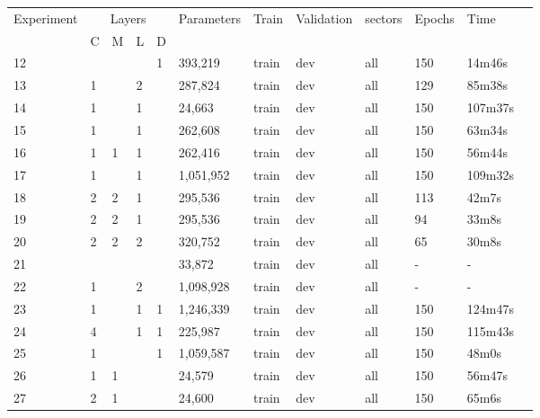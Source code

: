 \begin{table}[]
\begin{tabular}{|l|l|l|l|l|l|l|l|l|l|l|l|}
\hline
Experiment & \multicolumn{4}{c|}{Layers}                                                                       & Parameters            & Train                 & Validation            & sectors               & Epochs & Time    \\ \cline{2-5}
   & C & M & L  & D &           &       &     &     &     &         \\ \hline
12 &   &   &    & 1 & 393,219   & train & dev & all & 150 & 14m46s  \\ \hline
13 & 1 &   &  2 &   & 287,824   & train & dev & all & 129 & 85m38s  \\ \hline
14 & 1 &   &  1 &   & 24,663    & train & dev & all & 150 & 107m37s \\ \hline
15 & 1 &   &  1 &   & 262,608   & train & dev & all & 150 & 63m34s  \\ \hline
16 & 1 & 1 &  1 &   & 262,416   & train & dev & all & 150 & 56m44s  \\ \hline
17 & 1 &   &  1 &   & 1,051,952 & train & dev & all & 150 & 109m32s \\ \hline
18 & 2 & 2 &  1 &   & 295,536   & train & dev & all & 113 & 42m7s   \\ \hline
19 & 2 & 2 &  1 &   & 295,536   & train & dev & all & 94  & 33m8s   \\ \hline
20 & 2 & 2 &  2 &   & 320,752   & train & dev & all & 65  & 30m8s   \\ \hline
21 &   &   &    &   & 33,872    & train & dev & all & -   & -       \\ \hline
22 & 1 &   &  2 &   & 1,098,928 & train & dev & all & -   & -       \\ \hline
23 & 1 &   &  1 & 1 & 1,246,339 & train & dev & all & 150 & 124m47s \\ \hline
24 & 4 &   &  1 & 1 & 225,987   & train & dev & all & 150 & 115m43s \\ \hline
25 & 1 &   &    & 1 & 1,059,587 & train & dev & all & 150 & 48m0s   \\ \hline
26 & 1 & 1 &    &   & 24,579    & train & dev & all & 150 & 56m47s  \\ \hline
27 & 2 & 1 &    &   & 24,600    & train & dev & all & 150 & 65m6s   \\ \hline
\end{tabular}
\end{table}
